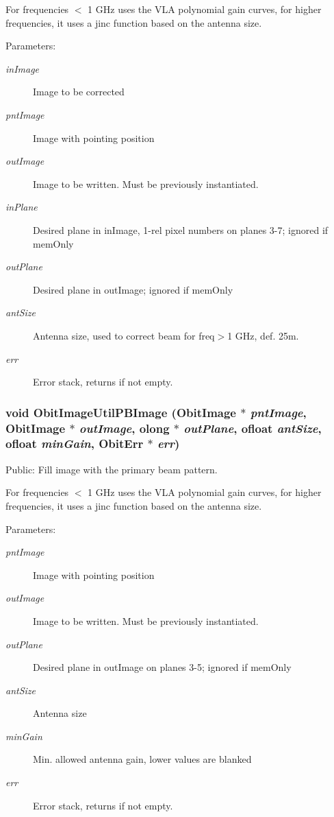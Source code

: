 For frequencies $<$ 1 GHz uses the VLA polynomial gain curves, for higher frequencies, it uses a jinc function based on the antenna size. \begin{Desc}
\item[Parameters:]
\begin{description}
\item[{\em in\-Image}]Image to be corrected \item[{\em pnt\-Image}]Image with pointing position \item[{\em out\-Image}]Image to be written. Must be previously instantiated. \item[{\em in\-Plane}]Desired plane in in\-Image, 1-rel pixel numbers on planes 3-7; ignored if mem\-Only \item[{\em out\-Plane}]Desired plane in out\-Image; ignored if mem\-Only \item[{\em ant\-Size}]Antenna size, used to correct beam for freq$>$1 GHz, def. 25m. \item[{\em err}]Error stack, returns if not empty. \end{description}
\end{Desc}
\subsubsection{\setlength{\rightskip}{0pt plus 5cm}void Obit\-Image\-Util\-PBImage ({\bf Obit\-Image} $\ast$ {\em pnt\-Image}, {\bf Obit\-Image} $\ast$ {\em out\-Image}, {\bf olong} $\ast$ {\em out\-Plane}, {\bf ofloat} {\em ant\-Size}, {\bf ofloat} {\em min\-Gain}, {\bf Obit\-Err} $\ast$ {\em err})}\label{ObitImageUtil_8c_a14}


Public: Fill image with the primary beam pattern. 

For frequencies $<$ 1 GHz uses the VLA polynomial gain curves, for higher frequencies, it uses a jinc function based on the antenna size. \begin{Desc}
\item[Parameters:]
\begin{description}
\item[{\em pnt\-Image}]Image with pointing position \item[{\em out\-Image}]Image to be written. Must be previously instantiated. \item[{\em out\-Plane}]Desired plane in out\-Image on planes 3-5; ignored if mem\-Only \item[{\em ant\-Size}]Antenna size \item[{\em min\-Gain}]Min. allowed antenna gain, lower values are blanked \item[{\em err}]Error stack, returns if not empty. \end{description}
\end{Desc}
